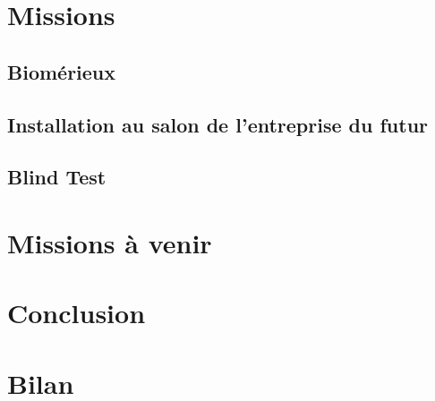 \documentclass{article}
\begin{document}
\section{Missions}

\subsection{Biomérieux}

\subsection{Installation au salon de l'entreprise du futur}

\subsection{Blind Test}

\section{Missions à venir}

\section{Conclusion}

\section{Bilan}
\end{document}
